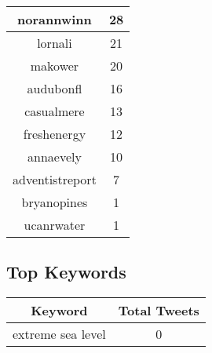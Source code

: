 \documentclass{article}\usepackage[T1]{fontenc}
\begin{document}
\begin{tabular}{|c|c|}
 \hline
norannwinn & 28\\ 
 \hline
lornali & 21\\ 
 \hline
makower & 20\\ 
 \hline
audubonfl & 16\\ 
 \hline
casualmere & 13\\ 
 \hline
freshenergy & 12\\ 
 \hline
annaevely & 10\\ 
 \hline
adventistreport & 7\\ 
 \hline
bryanopines & 1\\ 
 \hline
ucanrwater & 1\\ 
 \hline
\end{tabular}\subsection*{Top Keywords}\begin{tabular}{|c|c|}         \hline         Keyword & Total Tweets \\ 
 \hline
extreme sea level & 0\\ 
 \hline
\end{tabular}
\end{document}
